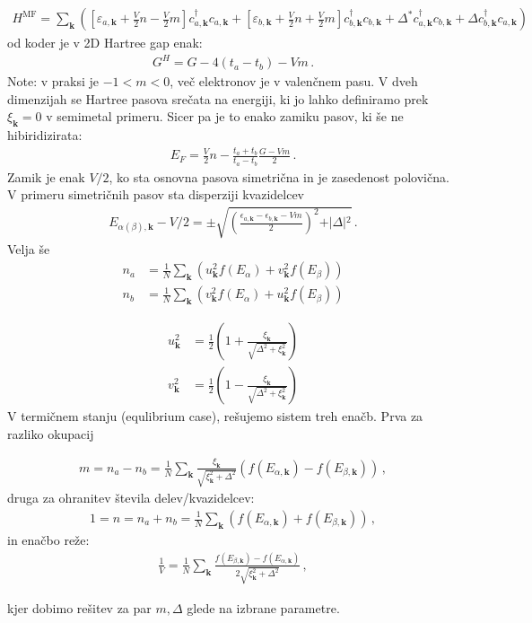 \documentclass[a4paper,10pt]{article}
\renewcommand{\vec}[1]{\mathbf{#1}}
\begin{document}
\begin{align}
  H^{\text{MF}} = \sum_{\vec{k}} \left( \left[\varepsilon_{a,\vec{k}} + \frac{V}{2}n - \frac{V}{2}m\right] c_{a,\vec{k}}^\dagger c_{a,\vec{k}} + \left[\varepsilon_{b,\vec{k}} + \frac{V}{2}n +\frac{V}{2}m\right] c_{b,\vec{k}}^\dagger c_{b,\vec{k}} + \Delta^* c_{a,\vec{k}}^\dagger c_{b,\vec{k}} + \Delta c_{b,\vec{k}}^\dagger c_{a,\vec{k}} \right)
\end{align}
od koder je v 2D Hartree gap enak: 
\begin{align}
  G^H = G-4(t_a-t_b) - V m\,. 
\end{align}
Note: v praksi je $-1<m<0$, več elektronov je v valenčnem pasu. V dveh dimenzijah se Hartree pasova srečata na energiji, ki jo lahko definiramo prek $\xi_{\vec{k}} = 0$ v semimetal primeru. Sicer pa je to enako zamiku pasov, ki še ne hibiridizirata: 
\begin{align}
  E_F = \frac{V}{2}n - \frac{t_a + t_b}{t_a-t_b}\frac{G-Vm}{2}\,.
\end{align}
Zamik je enak $V/2$, ko sta osnovna pasova simetrična in je zasedenost polovična. V primeru simetričnih pasov sta disperziji kvazidelcev
\begin{align}
  E_{\alpha(\beta), \vec{k}} - V/2 = \pm \sqrt{\left(\frac{{\epsilon}_{a, \vec{k}} - {\epsilon}_{b,\vec{k}} - Vm}{2}\right)^2 + \vert{}\Delta\vert{}^2}\,.
\end{align}
Velja še
\begin{align}
  n_a &= \frac{1}{N} \sum_{\vec{k}} \left( u_{\vec{k}}^2 f(E_\alpha) + v_{\vec{k}}^2 f(E_{\beta}) \right) \\
  n_b &= \frac{1}{N} \sum_{\vec{k}} \left( v_{\vec{k}}^2 f(E_\alpha) + u_{\vec{k}}^2 f(E_{\beta}) \right)
\end{align}

\begin{align}
  u_{\vec{k}}^2 &= \frac{1}{2}\left(1 + \frac{\xi_{\vec{k}}}{\sqrt{\Delta^2 + \xi_{\vec{k}}^2}}\right) \\
  v_{\vec{k}}^2 &= \frac{1}{2}\left(1 - \frac{\xi_{\vec{k}}}{\sqrt{\Delta^2 + \xi_{\vec{k}}^2}}\right)
\end{align}
V termičnem stanju (equlibrium case), rešujemo sistem treh enačb. Prva za razliko okupacij
\begin{tcolorbox}
\begin{align}
  m = n_a-n_b = \frac{1}{N}\sum_{\vec{k}} \frac{\xi_\vec{k}}{\sqrt{\xi_\vec{k}^2+\Delta^2}} (f(E_{\alpha, \vec{k}}) - f(E_{\beta, \vec{k}}))\,,
\end{align}
druga za ohranitev števila delev/kvazidelcev:
\begin{align}
  1 = n = n_a+n_b = \frac{1}{N}\sum_{\vec{k}} (f(E_{\alpha, \vec{k}}) + f(E_{\beta, \vec{k}}))\,,
\end{align}
in enačbo reže: 
\begin{align}
  \frac{1}{V} = \frac{1}{N} \sum_{\vec{k}} \frac{f(E_{\beta, \vec{k}}) - f(E_{\alpha, \vec{k}})}{2\sqrt{\xi_\vec{k}^2+\Delta^2}}\,,
\end{align}
\end{tcolorbox}\noindent
kjer dobimo rešitev za par $m, \Delta$ glede na izbrane parametre. 
\end{document}
